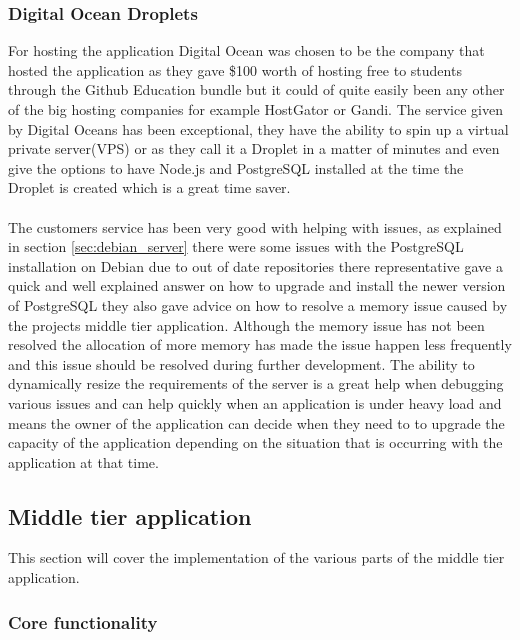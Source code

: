 \subsubsection{Digital Ocean Droplets}
\label{sec:digial_oceans}

For hosting the application Digital Ocean was chosen to be the company that hosted the application as they gave \$100 worth of hosting free to students through the Github Education bundle but it could of quite easily been any other of the big hosting companies for example HostGator or Gandi. The service given by Digital Oceans has been exceptional, they have the ability to spin up a virtual private server(VPS) or as they call it a Droplet in a matter of minutes and even give the options to have Node.js and PostgreSQL installed at the time the Droplet is created which is a great time saver.\\
\\
The customers service has been very good with helping with issues, as explained in section \ref{sec:debian_server} there were some issues with the PostgreSQL installation on Debian due to out of date repositories there representative gave a quick and well explained answer on how to upgrade and install the newer version of PostgreSQL they also gave advice on how to resolve a memory issue caused by the projects middle tier application. Although the memory issue has not been resolved the allocation of more memory has made the issue happen less frequently and this issue should be resolved during further development. The ability to dynamically resize the requirements of the server is a great help when debugging various issues and can help quickly when an application is under heavy load and means the owner of the application can decide when they need to to upgrade the capacity of the application depending on the situation that is occurring with the application at that time.

\subsection{Middle tier application}

This section will cover the implementation of the various parts of the middle tier application.

\subsubsection{Core functionality}

